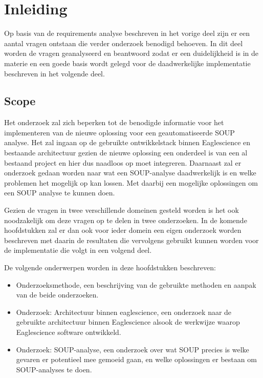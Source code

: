 
\chapter{Inleiding}\label{ch:inleiding3} %


\label{inOnderzoek} %
Op basis van de requirements analyse beschreven in het vorige deel zijn er een aantal vragen ontstaan die verder onderzoek benodigd behoeven.
In dit deel worden de vragen geanalyseerd en beantwoord zodat er een duidelijkheid is in de materie en een goede basis wordt gelegd voor de daadwerkelijke implementatie beschreven in het volgende deel.

\section{Scope}\label{sec:scope}
Het onderzoek zal zich beperken tot de benodigde informatie voor het implementeren van de nieuwe oplossing voor een geautomatiseerde SOUP analyse.
Het zal ingaan op de gebruikte ontwikkelstack binnen Eaglescience en bestaande architectuur gezien de nieuwe oplossing een onderdeel is van een al bestaand project en hier dus naadloos op moet integreren.
Daarnaast zal er onderzoek gedaan worden naar wat een SOUP-analyse daadwerkelijk is en welke problemen het mogelijk op kan lossen.
Met daarbij een mogelijke oplossingen om een SOUP analyse te kunnen doen.

Gezien de vragen in twee verschillende domeinen gesteld worden is het ook noodzakelijk om deze vragen op te delen in twee onderzoeken.
In de komende hoofdstukken zal er dan ook voor ieder domein een eigen onderzoek worden beschreven met daarin de resultaten die vervolgens gebruikt kunnen worden voor de implementatie die volgt in een volgend deel.

De volgende onderwerpen worden in deze hoofdstukken beschreven:
\begin{itemize}
    \item Onderzoeksmethode, een beschrijving van de gebruikte methoden en aanpak van de beide onderzoeken.
    \item Onderzoek: Architectuur binnen eaglescience, een onderzoek naar de gebruikte architectuur binnen Eaglescience alsook de werkwijze waarop Eaglescience software ontwikkeld.
    \item Onderzoek: SOUP-analyse, een onderzoek over wat SOUP precies is welke gevaren er potentieel mee gemoeid gaan, en welke oplossingen er bestaan om SOUP-analyses te doen.
\end{itemize}
